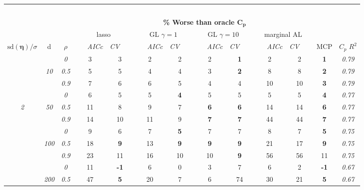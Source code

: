 \documentclass[12pt]{article}
\newcommand{\bs}[1]{\boldsymbol{#1}}
\newcommand{\mr}[1]{\mathrm{#1}}
\begin{document}
\begin{table}
\vspace{-.2cm}
\footnotesize
\begin{center}
\begin{tabular}{ccc|cc|cc|cc|cc|c|c}
\hline &&&\multicolumn{9}{|c|}{~}\\[-1ex]
\multicolumn{3}{c}{~}&\multicolumn{9}{|c|}{\bf \% Worse than oracle $\boldsymbol{C_p}$  } &   \\[1ex]
& &
& \multicolumn{2}{c}{lasso} 
& \multicolumn{2}{c}{GL $\gamma=1$} 
& \multicolumn{2}{c}{GL $\gamma=10$} 
& \multicolumn{2}{c}{marginal AL} 
& \multicolumn{1}{c|}{~} & \\[-0.5ex]
$\mr{sd}(\bs{\eta})/\sigma$ & {\sf d} & $\rho$ 
& ~~~\scriptsize\it AICc & \multicolumn{1}{c}{\scriptsize\it CV~~~}
& ~~~\scriptsize\it AICc & \multicolumn{1}{c}{\scriptsize\it CV~~~}
& ~~~\scriptsize\it AICc & \multicolumn{1}{c}{\scriptsize\it CV~~~}
& ~~~\scriptsize\it AICc & \multicolumn{1}{c}{\scriptsize\it CV~~~} 
& \multicolumn{1}{c|}{ MCP} & $C_p$ $R^2$ \\[.5ex]
\hline\rule{0pt}{3ex}
& & \it  0  & 3 & 3 & 2 & 2 & 2 & {\bf 1} & 2 & 2 & {\bf 1} & \it  0.79 \\
 & \it  10  & \it  0.5  & 5 & 5 & 4 & 4 & 3 & {\bf 2} & 8 & 8 & {\bf 2} & \it  0.79 \\
& & \it  0.9  & 7 & 6 & 6 & 5 & 4 & 4 & 10 & 10 & {\bf 3} & \it  0.79 \\[1ex]
\cline{2-3}\rule{0pt}{3ex}
& & \it  0  & 6 & 5 & 5 & {\bf 4} & 5 & 5 & 5 & 5 & {\bf 4} & \it  0.77 \\
\it  2  & \it  50  & \it  0.5  & 11 & 8 & 9 & 7 & {\bf 6} & {\bf 6} & 14 & 14 & {\bf 6} & \it  0.77 \\
& & \it  0.9  & 14 & 10 & 11 & 9 & {\bf 7} & {\bf 7} & 44 & 44 & {\bf 7} & \it  0.77 \\[1ex]
\cline{2-3}\rule{0pt}{3ex}
& & \it  0  & 9 & 6 & 7 & {\bf 5} & 7 & 7 & 8 & 7 & {\bf 5} & \it  0.75 \\
 & \it  100  & \it  0.5  & 18 & {\bf 9} & 13 & {\bf 9} & {\bf 9} & {\bf 9} & 21 & 17 & {\bf 9} & \it  0.75 \\
& & \it  0.9  & 23 & 11 & 16 & 10 & 10 & {\bf 9} & 56 & 56 & 11 & \it  0.75 \\[1ex]
\cline{2-3}\rule{0pt}{3ex}
& & \it  0  & 11 & {\bf -1} & 6 & 0 & 3 & 7 & 6 & 2 & {\bf -1} & \it  0.67 \\
 & \it  200  & \it  0.5  & 47 & {\bf 5} & 20 & 7 & 6 & 74 & 30 & 21 & {\bf 5} & \it  0.67 \\

\end{tabular}
\end{center}
\end{table}
\end{document}
